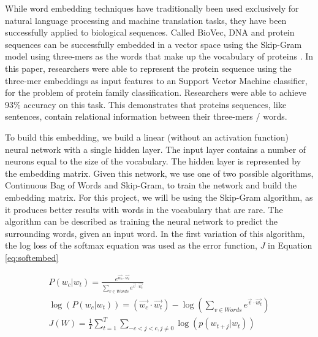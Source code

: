 \documentclass[pageno]{jpaper}
\begin{document}
\par
While word embedding techniques have traditionally been used exclusively for natural language processing and machine translation tasks, they have been successfully applied to biological sequences.  Called BioVec, DNA and protein sequences can be successfully embedded in a vector space using the Skip-Gram model using three-mers as the words that make up the vocabulary of proteins \cite{asgari:2015}.  In this paper, researchers were able to represent the protein sequence using the three-mer embeddings as input features to an Support Vector Machine classifier, for the problem of protein family classification.  Researchers were able to achieve 93\% accuracy on this task.  This demonstrates that proteins sequences, like sentences, contain relational information between their three-mers / words.

\par
To build this embedding, we build a linear (without an activation function) neural network with a single hidden layer.  The input layer contains a number of neurons equal to the size of the vocabulary.  The hidden layer is represented by the embedding matrix.  Given this network, we use one of two possible algorithms, Continuous Bag of Words and Skip-Gram, to train the network and build the embedding matrix.  For this project, we will be using the Skip-Gram algorithm, as it produces better results with words in the vocabulary that are rare.  The algorithm can be described as training the neural network to predict the surrounding words, given an input word.  In the first variation of this algorithm, the log loss of the softmax equation was used as the error function, $J$ in Equation \ref{eq:softembed}

\begin{subequations}
\label{eq:softembed}
\begin{gather}
P(w_{c} \vert w_{t}) = \frac{e^{\vec{w_{c}} \cdot \vec{w_{t}}}}{\sum_{v \in Words} e^{\vec{v} \cdot \vec{w_{t}}}}\\
\log(P(w_{c} \vert w_{t})) = \left(\vec{w_{c}} \cdot \vec{w_{t}}\right) - \log\left( \sum_{v \in Words} e^{\vec{v} \cdot \vec{w_{t}}} \right) \\
J(W) = \frac{1}{T} \sum_{t = 1}^{T} \sum_{-c < j < c, j \neq 0} \log(p(w_{t + j} \vert w_{t}))
\end{gather}
\end{subequations}
\end{document}
